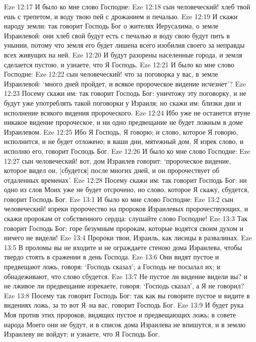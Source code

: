 Eze 12:17  И было ко мне слово Господне:
Eze 12:18  сын человеческий! хлеб твой ешь с трепетом, и воду твою пей с дрожанием и печалью.
Eze 12:19  И скажи народу земли: так говорит Господь Бог о жителях Иерусалима, о земле Израилевой: они хлеб свой будут есть с печалью и воду свою будут пить в унынии, потому что земля его будет лишена всего изобилия своего за неправды всех живущих на ней.
Eze 12:20  И будут разорены населенные города, и земля сделается пустою, и узнаете, что Я Господь.
Eze 12:21  И было ко мне слово Господне:
Eze 12:22  сын человеческий! что за поговорка у вас, в земле Израилевой: `много дней пройдет, и всякое пророческое видение исчезнет'?
Eze 12:23  Посему скажи им: так говорит Господь Бог: уничтожу эту поговорку, и не будут уже употреблять такой поговорки у Израиля; но скажи им: близки дни и исполнение всякого видения пророческого.
Eze 12:24  Ибо уже не останется втуне никакое видение пророческое, и ни одно предвещание не будет ложным в доме Израилевом.
Eze 12:25  Ибо Я Господь, Я говорю; и слово, которое Я говорю, исполнится, и не будет отложено; в ваши дни, мятежный дом, Я изрек слово, и исполню его, говорит Господь Бог.
Eze 12:26  И было ко мне слово Господне:
Eze 12:27  сын человеческий! вот, дом Израилев говорит: `пророческое видение, которое видел он, [сбудется] после многих дней, и он пророчествует об отдаленных временах'.
Eze 12:28  Посему скажи им: так говорит Господь Бог: ни одно из слов Моих уже не будет отсрочено, но слово, которое Я скажу, сбудется, говорит Господь Бог.
Eze 13:1  И было ко мне слово Господне:
Eze 13:2  сын человеческий! изреки пророчество на пророков Израилевых пророчествующих, и скажи пророкам от собственного сердца: слушайте слово Господне!
Eze 13:3  Так говорит Господь Бог: горе безумным пророкам, которые водятся своим духом и ничего не видели!
Eze 13:4  Пророки твои, Израиль, как лисицы в развалинах.
Eze 13:5  В проломы вы не входите и не ограждаете стеною дома Израилева, чтобы твердо стоять в сражении в день Господа.
Eze 13:6  Они видят пустое и предвещают ложь, говоря: `Господь сказал'; а Господь не посылал их; и обнадеживают, что слово сбудется.
Eze 13:7  Не пустое ли видение видели вы? и не лживое ли предвещание изрекаете, говоря: `Господь сказал', а Я не говорил?
Eze 13:8  Посему так говорит Господь Бог: так как вы говорите пустое и видите в видениях ложь, за то вот Я--на вас, говорит Господь Бог.
Eze 13:9  И будет рука Моя против этих пророков, видящих пустое и предвещающих ложь; в совете народа Моего они не будут, и в список дома Израилева не впишутся, и в землю Израилеву не войдут; и узнаете, что Я Господь Бог.
